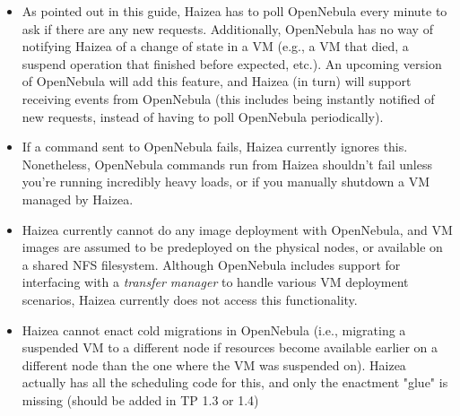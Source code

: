 \begin{itemize}
\item As pointed out in this guide, Haizea has to poll OpenNebula every minute to ask if there are any new requests. Additionally, OpenNebula has no way of notifying Haizea of a change of state in a VM (e.g., a VM that died, a suspend operation that finished before expected, etc.). An upcoming version of OpenNebula will add this feature, and Haizea (in turn) will support receiving events from OpenNebula (this includes being instantly notified of new requests, instead of having to poll OpenNebula periodically).
\item If a command sent to OpenNebula fails, Haizea currently ignores this. Nonetheless, OpenNebula commands run from Haizea shouldn't fail unless you're running incredibly heavy loads, or if you manually shutdown a VM managed by Haizea.
\item Haizea currently cannot do any image deployment with OpenNebula, and VM images are assumed to be predeployed on the physical nodes, or available on a shared NFS filesystem. Although OpenNebula includes support for interfacing with a \emph{transfer manager} to handle various VM deployment scenarios, Haizea currently does not access this functionality.
\item Haizea cannot enact cold migrations in OpenNebula (i.e., migrating a suspended VM to a different node if resources become available earlier on a different node than the one where the VM was suspended on). Haizea actually has all the scheduling code for this, and only the enactment "glue" is missing (should be added in TP 1.3 or 1.4)
\end{itemize}